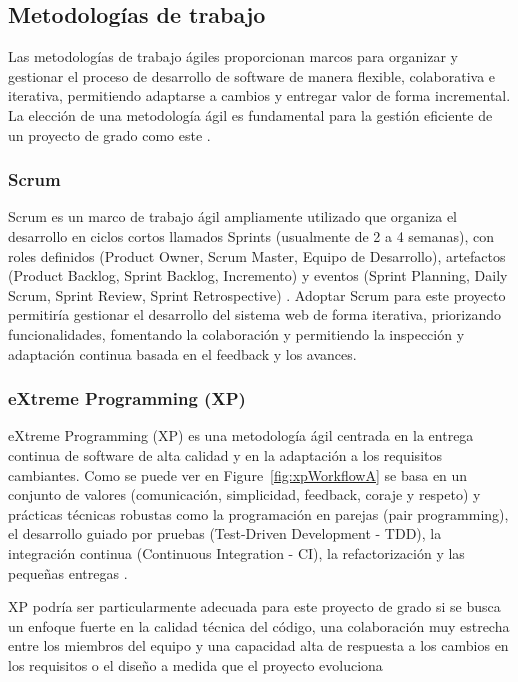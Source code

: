 \subsection{Metodologías de trabajo}
Las metodologías de trabajo ágiles proporcionan marcos para organizar y gestionar el proceso de desarrollo de software de manera flexible, colaborativa e iterativa, permitiendo adaptarse a cambios y entregar valor de forma incremental.
La elección de una metodología ágil es fundamental para la gestión eficiente de un proyecto de grado como este \parencite{Beck2001}.

\subsubsection{Scrum}
Scrum es un marco de trabajo ágil ampliamente utilizado que organiza el desarrollo en ciclos cortos llamados Sprints (usualmente de 2 a 4 semanas), con roles definidos (Product Owner, Scrum Master, Equipo de Desarrollo), artefactos (Product Backlog, Sprint Backlog, Incremento) y eventos (Sprint Planning, Daily Scrum, Sprint Review, Sprint Retrospective) \parencite{SchwaberSutherland2020}.
Adoptar Scrum para este proyecto permitiría gestionar el desarrollo del sistema web de forma iterativa, priorizando funcionalidades, fomentando la colaboración y permitiendo la inspección y adaptación continua basada en el feedback y los avances.

\subsubsection{eXtreme Programming (XP)}
eXtreme Programming (XP) es una metodología ágil centrada en la entrega continua de software de alta calidad y en la adaptación a los requisitos cambiantes.
Como se puede ver en Figure~\ref{fig:xpWorkflowA} se basa en un conjunto de valores (comunicación, simplicidad, feedback, coraje y respeto) y prácticas técnicas robustas como la programación en parejas (pair programming), el desarrollo guiado por pruebas (Test-Driven Development - TDD), la integración continua (Continuous Integration - CI), la refactorización y las pequeñas entregas \parencite{Beck2004}.

XP podría ser particularmente adecuada para este proyecto de grado si se busca un enfoque fuerte en la calidad técnica del código, una colaboración muy estrecha entre los miembros del equipo y una capacidad alta de respuesta a los cambios en los requisitos o el diseño a medida que el proyecto evoluciona

